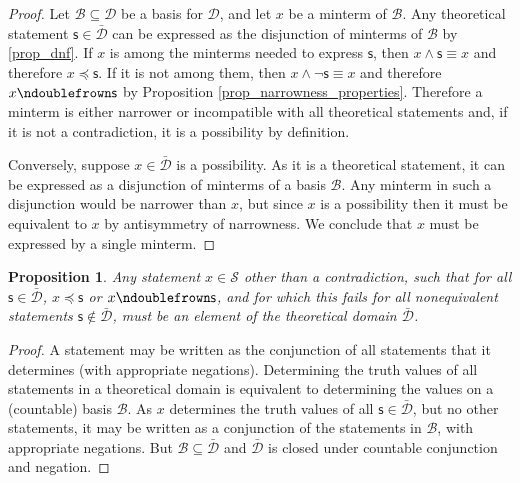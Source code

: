 \documentclass[psamsfonts]{amsart}
\newtheorem{prop}[thm]{Proposition}
\theoremstyle{definition}
\theoremstyle{remark}
\numberwithin{equation}{section}
\def\stmtSet{\mathcal{S}}
\def\ncomp{\ndoublefrown}
\def\narrower{\preccurlyeq}
\def\AND{\wedge}
\def\NOT{\neg}
\newcommand{\stmt}[1][s] {\mathsf{#1}}
\newcommand{\edomain}[1][D] {\mathcal{#1}}
\newcommand{\tdomain}[1][D] {\bar{\mathcal{#1}}}
\newcommand{\basis}[1][B] {\mathcal{#1}} %
\begin{document}
\begin{proof}
	Let $\basis \subseteq \edomain$ be a basis for $\edomain$, and let $x$ be a minterm of $\basis$. Any theoretical statement $\stmt \in \tdomain$ can be expressed as the disjunction of minterms of $\basis$ by \ref{prop_dnf}. If $x$ is among the minterms needed to express $\stmt$, then $x \AND \stmt \equiv x$ and therefore $x \narrower \stmt$. If it is not among them, then $x \AND \NOT \stmt \equiv x$ and therefore $x \ncomp \stmt$ by Proposition \ref{prop_narrowness_properties}. Therefore a minterm is either narrower or incompatible with all theoretical statements and, if it is not a contradiction, it is a possibility by definition.
	
	Conversely, suppose $x \in \tdomain$ is a possibility. As it is a theoretical statement, it can be expressed as a disjunction of minterms of a basis $\basis$. Any minterm in such a disjunction would be narrower than $x$, but since $x$ is a possibility then it must be equivalent to $x$ by antisymmetry of narrowness. We conclude that $x$ must be expressed by a single minterm.
\end{proof}


\begin{prop} \label{no_other_poss}
Any statement $x\in\stmtSet$ other than a contradiction, such that for all $\stmt\in\tdomain$, $x\narrower\stmt$ or $x\ncomp\stmt$, and for which this fails for all nonequivalent statements $\stmt\notin\tdomain$, must be an element of the theoretical domain $\tdomain$. 
\end{prop}
\begin{proof}
A statement may be written as the conjunction of all statements that it determines (with appropriate negations). Determining the truth values of all statements in a theoretical domain is equivalent to determining the values on a (countable) basis $\basis$. As $x$ determines the truth values of all $\stmt\in\tdomain$, but no other statements, it may be written as a conjunction of the statements in $\basis$, with appropriate negations. But $\basis\subseteq\tdomain$ and $\tdomain$ is closed under countable conjunction and negation. 
\end{proof}
\end{document}
